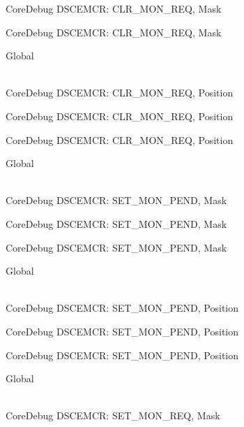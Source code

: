 \begin{DoxyRefList}
\label{deprecated__deprecated000523}%
%
Core\+Debug DSCEMCR\+: CLR\+\_\+\+MON\+\_\+\+REQ, Mask 

\label{deprecated__deprecated000625}%
%
Core\+Debug DSCEMCR\+: CLR\+\_\+\+MON\+\_\+\+REQ, Mask  
\item[{\parbox[t]{\linewidth}{Global \doxylink{group___c_m_s_i_s___s_c_b_ga1e2e3a310143f4663f1c415c03c3d535}{Core\+Debug\+\_\+\+DSCEMCR\+\_\+\+CLR\+\_\+\+MON\+\_\+\+REQ\+\_\+\+Pos} }}]\hfill \\
\label{deprecated__deprecated000071}%
%
Core\+Debug DSCEMCR\+: CLR\+\_\+\+MON\+\_\+\+REQ, Position 

\label{deprecated__deprecated000522}%
%
Core\+Debug DSCEMCR\+: CLR\+\_\+\+MON\+\_\+\+REQ, Position 

\label{deprecated__deprecated000624}%
%
Core\+Debug DSCEMCR\+: CLR\+\_\+\+MON\+\_\+\+REQ, Position  
\item[{\parbox[t]{\linewidth}{Global \doxylink{group___c_m_s_i_s___s_c_b_ga575045239507b73f338bcbb959ac6904}{Core\+Debug\+\_\+\+DSCEMCR\+\_\+\+SET\+\_\+\+MON\+\_\+\+PEND\+\_\+\+Msk} }}]\hfill \\
\label{deprecated__deprecated000078}%
%
Core\+Debug DSCEMCR\+: SET\+\_\+\+MON\+\_\+\+PEND, Mask 

\label{deprecated__deprecated000529}%
%
Core\+Debug DSCEMCR\+: SET\+\_\+\+MON\+\_\+\+PEND, Mask 

\label{deprecated__deprecated000631}%
%
Core\+Debug DSCEMCR\+: SET\+\_\+\+MON\+\_\+\+PEND, Mask  
\item[{\parbox[t]{\linewidth}{Global \doxylink{group___c_m_s_i_s___s_c_b_ga644ae3a13bcb9f2a80326bc5824f1b28}{Core\+Debug\+\_\+\+DSCEMCR\+\_\+\+SET\+\_\+\+MON\+\_\+\+PEND\+\_\+\+Pos} }}]\hfill \\
\label{deprecated__deprecated000077}%
%
Core\+Debug DSCEMCR\+: SET\+\_\+\+MON\+\_\+\+PEND, Position 

\label{deprecated__deprecated000528}%
%
Core\+Debug DSCEMCR\+: SET\+\_\+\+MON\+\_\+\+PEND, Position 

\label{deprecated__deprecated000630}%
%
Core\+Debug DSCEMCR\+: SET\+\_\+\+MON\+\_\+\+PEND, Position  
\item[{\parbox[t]{\linewidth}{Global \doxylink{group___c_m_s_i_s___s_c_b_ga73d8960abbd67eeda64f27a77ed7baf2}{Core\+Debug\+\_\+\+DSCEMCR\+\_\+\+SET\+\_\+\+MON\+\_\+\+REQ\+\_\+\+Msk} }}]\hfill \\
\label{deprecated__deprecated000076}%
%
Core\+Debug DSCEMCR\+: SET\+\_\+\+MON\+\_\+\+REQ, Mask 


\end{DoxyRefList}
